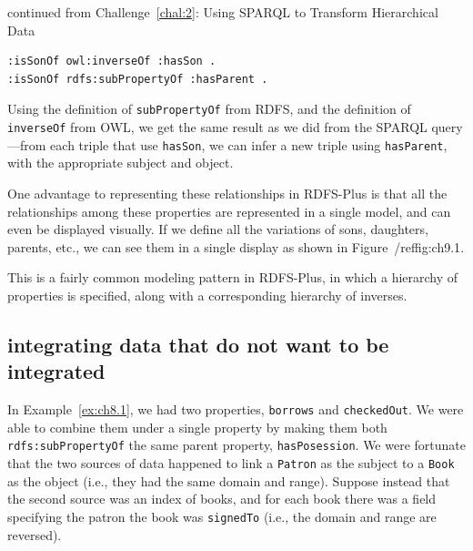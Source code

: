 \begin{challenge}{continued from Challenge~\protect\ref{chal:2}: Using SPARQL to Transform Hierarchical Data}
\begin{lstlisting}
:isSonOf owl:inverseOf :hasSon .
:isSonOf rdfs:subPropertyOf :hasParent .
\end{lstlisting}

Using the definition of \texttt{subPropertyOf} from RDFS, and the definition of
\texttt{inverseOf} from OWL, we get the same result as we did from the SPARQL
query---from each triple that use \texttt{hasSon}, we can infer a new triple
using \texttt{hasParent}, with the appropriate subject and object.

One advantage to representing these relationships in RDFS-Plus is that
all the relationships among these properties are represented in a single
model, and can even be displayed visually. If we define all the
variations of sons, daughters, parents, etc., we can see them in a
single display as shown in Figure~/ref{fig:ch9.1}.

This is a fairly common modeling pattern in RDFS-Plus, in which a
hierarchy of properties is specified, along with a corresponding
hierarchy of inverses.
\end{challenge}

\subsection{integrating data that do not want to be integrated}

In  Example~\ref{ex:ch8.1}, we had two properties, \texttt{borrows} and
\texttt{checkedOut}. We were able to combine them under a single property by
making them both \texttt{rdfs:subPropertyOf} the same parent property,
\texttt{hasPosession}. We were fortunate that the two sources of data happened to
link a \texttt{Patron} as the subject to a \texttt{Book} as the object (i.e., they had the
same domain and range). Suppose instead that the second source was an
index of books, and for each book there was a field specifying the
patron the book was \texttt{signedTo} (i.e., the domain and range are reversed).

